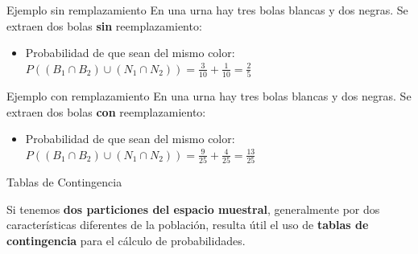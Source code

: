 \documentclass[11pt]{beamer}
\begin{document}
\begin{frame}{Ejemplo sin remplazamiento}
En una urna hay tres bolas blancas y dos negras. Se extraen dos bolas \textbf{sin} reemplazamiento:

\pause
\begin{itemize}[<+->]
\item Probabilidad de que sean del mismo color: \\
\pause
$P((B_1\cap B_2)\cup (N_1\cap N_2))=\frac{3}{10}+\frac{1}{10}=\frac{2}{5}$
\end{itemize}

\end{frame}

\begin{frame}{Ejemplo con remplazamiento}
En una urna hay tres bolas blancas y dos negras. Se extraen dos bolas \textbf{con} reemplazamiento:

\pause
\begin{itemize}
\item Probabilidad de que sean del mismo color: \\
\pause
$P((B_1\cap B_2)\cup (N_1\cap N_2))=\frac{9}{25}+\frac{4}{25}=\frac{13}{25}$
\end{itemize}

\end{frame}

\begin{frame}{Tablas de Contingencia}
\begin{block}{}
Si tenemos \textbf{dos particiones del espacio muestral}, generalmente por dos características diferentes de la población, resulta útil el uso de \textbf{tablas de contingencia} para el cálculo de probabilidades.
\end{block}
\end{frame}
\end{document}
